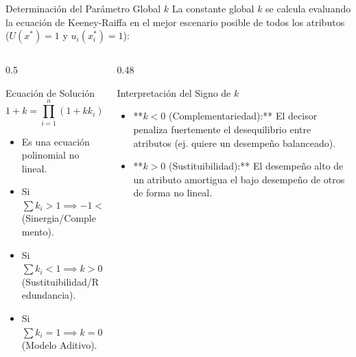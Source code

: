 \documentclass[aspectratio=169, 10pt]{beamer}
\begin{document}
\begin{frame}{Determinación del Parámetro Global $k$}
    La constante global $k$ se calcula evaluando la ecuación de Keeney-Raiffa en el mejor escenario posible de todos los atributos ($U(x^*)=1$ y $u_i(x_i^*)=1$):
    \begin{columns}
        \begin{column}{0.5\textwidth}
            \begin{exampleblock}{Ecuación de Solución}
                \begin{equation*}
                    1 + k = \prod_{i=1}^n (1 + k k_i)
                \end{equation*}
                \scriptsize
                \begin{itemize}
                    \item Es una ecuación polinomial no lineal.
                    \item Si $\sum k_i > 1 \implies -1 < k < 0$ (Sinergia/Complemento).
                    \item Si $\sum k_i < 1 \implies k > 0$ (Sustituibilidad/Redundancia).
                    \item Si $\sum k_i = 1 \implies k = 0$ (Modelo Aditivo).
                \end{itemize}
            \end{exampleblock}
        \end{column}
        
        \begin{column}{0.48\textwidth}
            \begin{block}{Interpretación del Signo de $k$}
                \scriptsize
                \begin{itemize}
                    \item **$k < 0$ (Complementariedad):** El decisor penaliza fuertemente el desequilibrio entre atributos (ej. quiere un desempeño balanceado).
                    \item **$k > 0$ (Sustituibilidad):** El desempeño alto de un atributo amortigua el bajo desempeño de otros de forma no lineal.
                \end{itemize}
            \end{block}
        \end{column}
    \end{columns}
\end{frame}

\end{document}
